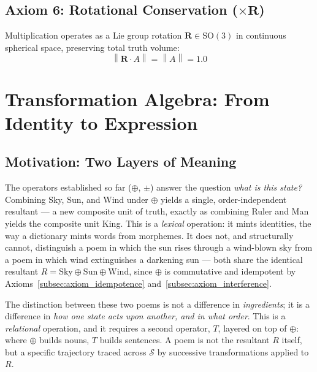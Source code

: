 \documentclass[12pt, a4paper]{article}
\providecommand{\norm}[1]{\left\lVert#1\right\rVert}
\begin{document}
\subsection{Axiom 6: Rotational Conservation (\texorpdfstring{$\times \mathbf{R}$}{x R})}
\label{subsec:axiom_rotation}
Multiplication operates as a Lie group rotation $\mathbf{R} \in \mathrm{SO}(3)$ in continuous spherical space, preserving total truth volume:
\begin{equation}
    \norm{\mathbf{R} \cdot A} = \norm{A} = 1.0
\end{equation}

\section{Transformation Algebra: From Identity to Expression}
\label{sec:transformation_algebra}

\subsection{Motivation: Two Layers of Meaning}
\label{subsec:transform_motivation}
The operators established so far ($\oplus$, $\pm$) answer the question
\emph{what is this state?} Combining Sky, Sun, and Wind under $\oplus$
yields a single, order-independent resultant --- a new composite unit
of truth, exactly as combining Ruler and Man yields the composite unit
King. This is a \emph{lexical} operation: it mints identities, the way
a dictionary mints words from morphemes. It does not, and structurally
cannot, distinguish a poem in which the sun rises through a wind-blown
sky from a poem in which wind extinguishes a darkening sun --- both
share the identical resultant
$R = \text{Sky} \oplus \text{Sun} \oplus \text{Wind}$, since $\oplus$
is commutative and idempotent by Axioms~\ref{subsec:axiom_idempotence}
and~\ref{subsec:axiom_interference}.

The distinction between these two poems is not a difference in
\emph{ingredients}; it is a difference in \emph{how one state acts
upon another, and in what order}. This is a \emph{relational}
operation, and it requires a second operator, $T$, layered on top of
$\oplus$: where $\oplus$ builds nouns, $T$ builds sentences. A poem is
not the resultant $R$ itself, but a specific trajectory traced across
$\mathcal{S}$ by successive transformations applied to $R$.
\end{document}
